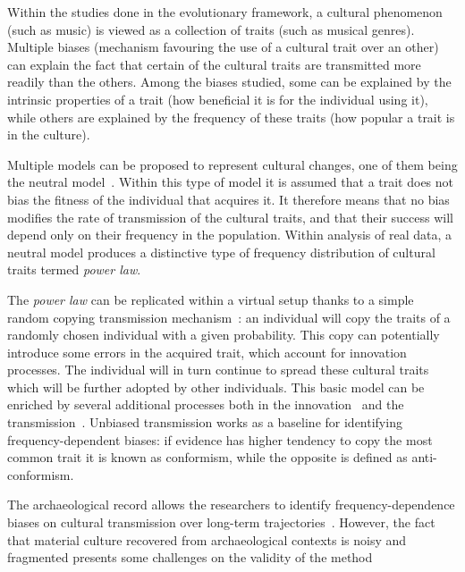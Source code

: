 \documentclass[a4paper]{article}
\begin{document}
Within the studies done in the evolutionary framework, a cultural phenomenon (such as music) is viewed as a collection of traits (such as musical genres). Multiple biases (mechanism favouring the use of a cultural trait over an other) can explain the fact that certain of the cultural traits are transmitted more readily than the others. Among the biases studied, some can be explained by the intrinsic properties of a trait (how beneficial it is for the individual using it), while others are explained by the frequency of these traits (how popular a trait is in the culture). 

Multiple models can be proposed to represent cultural changes, one of them being the neutral model~\cite{neiman_stylistic_1995}. Within this type of model it is assumed that a trait does not bias the fitness of the individual that acquires it. It therefore means that no bias modifies the rate of transmission of the cultural traits, and that their success will depend only on their frequency in the population. Within analysis of real data, a neutral model produces a distinctive type of frequency distribution of cultural traits termed \emph{power law}.
 
The \emph{power law} can be replicated within a virtual setup thanks to a simple random copying transmission mechanism~\cite{bentley_random_2004}: an individual will copy the traits of a randomly chosen individual with a given probability. This copy can potentially introduce some errors in the acquired trait, which account for innovation processes. The individual will in turn continue to spread these cultural traits which will be further adopted by other individuals. This basic model can be enriched by several additional processes both in the innovation~\cite{schillinger_copying_2014,sole_evolutionary_2013,ziman_technological_2003} and the transmission~\cite{heyes_social_1994,henrich_evolution_2003}. Unbiased transmission works as a baseline for identifying frequency-dependent biases: if evidence has higher tendency to copy the most common trait it is known as conformism, while the opposite is defined as anti-conformism.

The archaeological record allows the researchers to identify frequency-dependence biases on cultural transmission over long-term trajectories~\cite{lipo_neutralitystyle_2001,shennan_ceramic_2001,steele_ceramic_2010}. However, the fact that material culture recovered from archaeological contexts is noisy and fragmented presents some challenges on the validity of the method~\cite{kandler_nonequilibrium_2013,porcic_exploring_2014,crema_approximate_2014}
\end{document}
